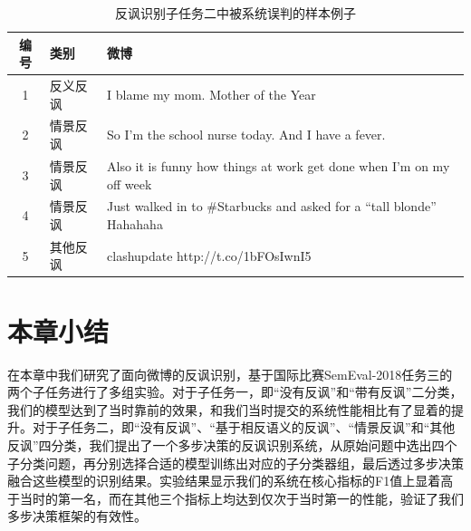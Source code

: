 \begin{table}[htb]
  \centering
  \begin{minipage}[t]{\linewidth} %
  \caption{反讽识别子任务二中被系统误判的样本例子}
  \label{tab:semeval_2018_task3_error}
  \begin{tabularx}{\linewidth}{c|l|X}
    \toprule[1.5pt]
    编号 & 类别 & 微博 \\
    \hline
    1 & 反义反讽 & I blame my mom. Mother of the Year \\
    2 & 情景反讽 & So I'm the school nurse today. And I have a fever. \\
    3 & 情景反讽 & Also it is funny how things at work get done when I'm on my off week \\
    4 & 情景反讽 & Just walked in to \#Starbucks and asked for a “tall blonde” Hahahaha \\
    5 & 其他反讽 & clashupdate http://t.co/1bFOsIwnI5 \\
    \bottomrule[1.5pt]
  \end{tabularx}
  \end{minipage}
\end{table}

\section{本章小结}

在本章中我们研究了面向微博的反讽识别，基于国际比赛SemEval-2018任务三的两个子任务进行了多组实验。对于子任务一，即“没有反讽”和“带有反讽”二分类，我们的模型达到了当时靠前的效果，和我们当时提交的系统性能相比有了显着的提升。对于子任务二，即“没有反讽”、“基于相反语义的反讽”、“情景反讽”和“其他反讽”四分类，我们提出了一个多步决策的反讽识别系统，从原始问题中选出四个子分类问题，再分别选择合适的模型训练出对应的子分类器组，最后透过多步决策融合这些模型的识别结果。实验结果显示我们的系统在核心指标的F1值上显着高于当时的第一名，而在其他三个指标上均达到仅次于当时第一的性能，验证了我们多步决策框架的有效性。

